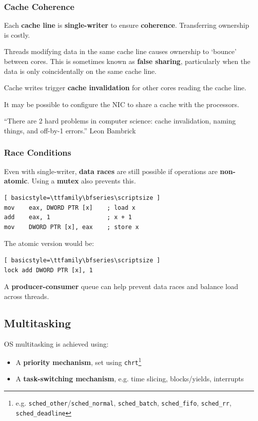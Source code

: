 \documentclass{article}
\begin{document}
\subsubsection{Cache Coherence}
Each \textbf{cache line} is \textbf{single-writer} to ensure \textbf{coherence}. Transferring ownership is costly.

Threads modifying data in the same cache line causes ownership to `bounce' between cores. This is sometimes known as \textbf{false sharing}, particularly when the data is only coincidentally on the same cache line.

Cache writes trigger \textbf{cache invalidation} for other cores reading the cache line.

It may be possible to configure the NIC to share a cache with the processors.

\begin{block}{}
	``There are 2 hard problems in computer science: cache invalidation, naming things, and off-by-1 errors.'' Leon Bambrick
\end{block}

\subsubsection{Race Conditions}
Even with single-writer, \textbf{data races} are still possible if operations are \textbf{non-atomic}. Using a \textbf{mutex} also prevents this.

\begin{lstlisting}[ basicstyle=\ttfamily\bfseries\scriptsize ]
mov    eax, DWORD PTR [x]    ; load x
add    eax, 1                ; x + 1
mov    DWORD PTR [x], eax    ; store x
\end{lstlisting}

The atomic version would be:
\begin{lstlisting}[ basicstyle=\ttfamily\bfseries\scriptsize ]
lock add DWORD PTR [x], 1
\end{lstlisting}

A \textbf{producer-consumer} queue can help prevent data races and balance load across threads.

\subsection{Multitasking}
OS multitasking is achieved using:
\begin{itemize}
	\item A \textbf{priority mechanism}, set using \texttt{chrt}\footnote{e.g. \texttt{sched\_other}/\texttt{sched\_normal}, \texttt{sched\_batch}, \texttt{sched\_fifo}, \texttt{sched\_rr}, \texttt{sched\_deadline}}
	\item A \textbf{task-switching mechanism}, e.g. time slicing, blocks/yields, interrupts
\end{itemize}
\end{document}
